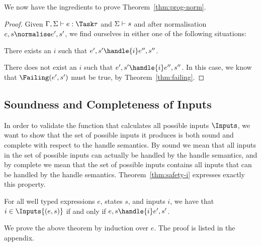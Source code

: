 
We now have the ingredients to prove Theorem~\ref{thm:prog-norm}.

\begin{proof}
  Given $\Gamma,\Sigma\infers e:\Task\tau$ and $\Sigma\vdash s$ and after
  normalisation $e,s \normalise e',s'$, we find ourselves in either one of the
  following situations:

  There exists an $i$ such that $e',s'\handle{i} e'',s''$.

  There does not exist an $i$ such that $e',s'\handle{i} e'',s''$. In this case, we
  know that $\Failing(e',s')$ must be true, by Theorem~\ref{thm:failing}.
\end{proof}



\subsection{Soundness and Completeness of Inputs}

In order to validate the function that calculates all possible inputs $\Inputs$,
we want to show that the set of possible inputs it produces is both sound and complete with respect to the handle semantics.
By sound we mean that all inputs in the set of possible inputs can actually be handled by the handle semantics,
and by complete we mean that the set of possible inputs contains all inputs that can be handled by the handle semantics.
Theorem~\ref{thm:safety-i} expresses exactly this property.

\begin{theorem}
  For all well typed expressions $e$, states $s$, and inputs $i$,
  we have that $i \in \Inputs{(e,s)}$ if and only if $e,s \handle{i} e',s'$.
  \label{thm:safety-i}
\end{theorem}

We prove the above theorem by induction over $e$. The proof is listed in the
appendix.
